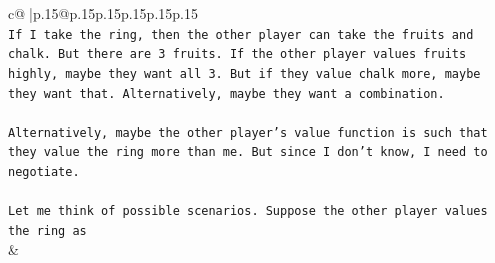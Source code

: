 \documentclass{article}
\begin{document}
{\begin{supertabular}{c@{$\;$}|p{.15\linewidth}@{}p{.15\linewidth}p{.15\linewidth}p{.15\linewidth}p{.15\linewidth}p{.15\linewidth}}
{{{\\ 
\texttt{If I take the ring, then the other player can take the fruits and chalk. But there are 3 fruits. If the other player values fruits highly, maybe they want all 3. But if they value chalk more, maybe they want that. Alternatively, maybe they want a combination.} \\
\\ 
\texttt{Alternatively, maybe the other player's value function is such that they value the ring more than me. But since I don't know, I need to negotiate.} \\
\\ 
\texttt{Let me think of possible scenarios. Suppose the other player values the ring as} \\
            }
        }
    }
    & \\ \\


\end{supertabular}}
\end{document}
